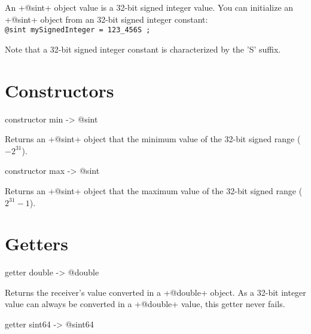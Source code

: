 

An \ggs+@sint+ object value is a 32-bit signed integer value. You can initialize an \ggs+@sint+ object from an 32-bit signed integer constant:\\

\texttt{@sint mySignedInteger = 123\_456S ;}

Note that a 32-bit signed integer constant is characterized by the 'S' suffix.


\section{Constructors}


\begin{galgascode}
constructor min -> @sint
\end{galgascode}

Returns an \ggs+@sint+ object that the minimum value of the 32-bit signed range ($-2^{31}$).






\begin{galgascode}
constructor max -> @sint
\end{galgascode}


Returns an \ggs+@sint+ object that the maximum value of the 32-bit signed range ($2^{31}-1$).



\section{Getters}


\begin{galgascode}
getter double -> @double
\end{galgascode}

Returns the receiver's value converted in a \ggs+@double+ object. As a 32-bit integer value can always be converted in a \ggs+@double+ value, this getter never fails.






\begin{galgascode}
getter sint64 -> @sint64
\end{galgascode}

